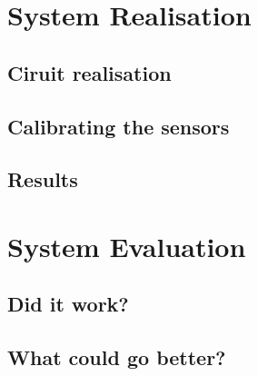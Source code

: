 \documentclass[a4paper,12pt]{article}
\begin{document}
{\section{System Realisation}
\subsection{Ciruit realisation}
\subsection{Calibrating the sensors}
\subsection{Results}

\section{System Evaluation}
\subsection{Did it work?}
\subsection{What could go better?}
}
\end{document}

